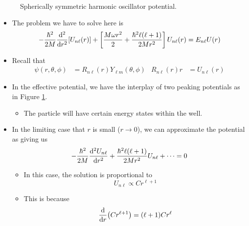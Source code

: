 \documentclass[../notes.tex]{subfiles}
\begin{document}
\begin{itemize}
\begin{figure}[h!]
        \caption{Spherically symmetric harmonic oscillator potential.}
        \label{fig:sphrSymHOV}
    \end{figure}
    \begin{itemize}
        \item The problem we have to solve here is
        \begin{equation*}
            -\frac{\hbar^2}{2M}\dv[2]{r}[U_{n\ell}(r)]+\left[ \frac{M\omega r^2}{2}+\frac{\hbar^2\ell(\ell+1)}{2Mr^2} \right]U_{n\ell}(r) = E_{n\ell}U(r)
        \end{equation*}
        \item Recall that
        \begin{align*}
            \psi(r,\theta,\phi) &= R_{n\ell}(r)Y_{\ell m}(\theta,\phi)&
            R_{n\ell}(r)r &= U_{n\ell}(r)
        \end{align*}
        \item In the effective potential, we have the interplay of two peaking potentials as in Figure \ref{fig:sphrSymHOV}.
        \begin{itemize}
            \item The particle will have certain energy states within the well.
        \end{itemize}
        \item In the limiting case that $r$ is small ($r\to 0$), we can approximate the potential as giving us
        \begin{equation*}
            -\frac{\hbar^2}{2M}\dv[2]{U_{n\ell}}{r}+\frac{\hbar^2\ell(\ell+1)}{2Mr^2}U_{n\ell}+\cdots = 0
        \end{equation*}
        \begin{itemize}
            \item In this case, the solution is proportional to
            \begin{equation*}
                U_{n\ell} \propto Cr^{\ell+1}
            \end{equation*}
            \item This is because
            \begin{align*}
                \dv{r}(Cr^{\ell+1}) &= (\ell+1)Cr^\ell\\

\end{align*}
\end{itemize}
\end{itemize}
\end{itemize}
\end{document}
